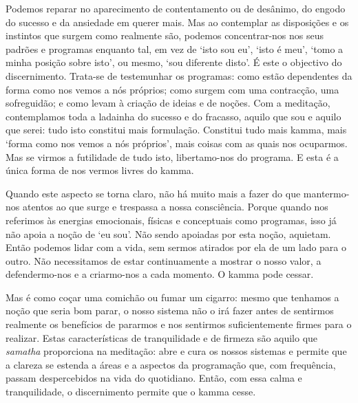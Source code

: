 Podemos reparar no aparecimento de contentamento ou de desânimo, do engodo do sucesso e da ansiedade em querer mais. Mas ao contemplar as disposições e os instintos que surgem como realmente são, podemos concentrar-nos nos seus padrões e programas enquanto tal, em vez de `isto sou eu', `isto é meu', `tomo a minha posição sobre isto', ou mesmo, `sou diferente disto'. É este o objectivo do discernimento. Trata-se de testemunhar os programas: como estão dependentes da forma como nos vemos a nós próprios; como surgem com uma contracção, uma sofreguidão; e como levam à criação de ideias e de noções. Com a meditação, contemplamos toda a ladainha do sucesso e do fracasso, aquilo que sou e aquilo que serei: tudo isto constitui mais formulação. Constitui tudo mais kamma, mais `forma como nos vemos a nós próprios', mais coisas com as quais nos ocuparmos. Mas se virmos a futilidade de tudo isto, libertamo-nos do programa. E esta é a única forma de nos vermos livres do kamma.

Quando este aspecto se torna claro, não há muito mais a fazer do que mantermo-nos atentos ao que surge e trespassa a nossa consciência. Porque quando nos referimos às energias emocionais, físicas e conceptuais como programas, isso já não apoia a noção de `eu sou'. Não sendo apoiadas por esta noção, aquietam. Então podemos lidar com a vida, sem sermos atirados por ela de um lado para o outro. Não necessitamos de estar continuamente a mostrar o nosso valor, a defendermo-nos e a criarmo-nos a cada momento. O kamma pode cessar.

Mas é como coçar uma comichão ou fumar um cigarro: mesmo que tenhamos a noção que seria bom parar, o nosso sistema não o irá fazer antes de sentirmos realmente os benefícios de pararmos e nos sentirmos suficientemente firmes para o realizar. Estas características de tranquilidade e de firmeza são aquilo que \emph{samatha} proporciona na meditação: abre e cura os nossos sistemas e permite que a clareza se estenda a áreas e a aspectos da programação que, com frequência, passam despercebidos na vida do quotidiano. Então, com essa calma e tranquilidade, o discernimento permite que o kamma cesse.
